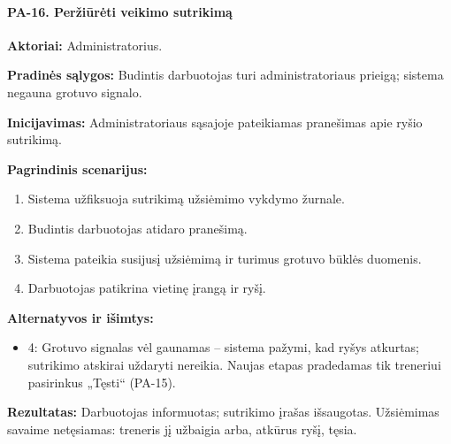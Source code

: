 \paragraph{PA-16. Peržiūrėti veikimo sutrikimą}\mbox{}\par
\textbf{Aktoriai:} Administratorius.\par
\textbf{Pradinės sąlygos:} Budintis darbuotojas turi administratoriaus prieigą; sistema negauna grotuvo signalo.\par
\textbf{Inicijavimas:} Administratoriaus sąsajoje pateikiamas pranešimas apie ryšio sutrikimą.\par
\textbf{Pagrindinis scenarijus:}
\begin{enumerate}
\item Sistema užfiksuoja sutrikimą užsiėmimo vykdymo žurnale.
\item Budintis darbuotojas atidaro pranešimą.
\item Sistema pateikia susijusį užsiėmimą ir turimus grotuvo būklės duomenis.
\item Darbuotojas patikrina vietinę įrangą ir ryšį.
\end{enumerate}
\textbf{Alternatyvos ir išimtys:}
\begin{itemize}
\item 4: Grotuvo signalas vėl gaunamas -- sistema pažymi, kad ryšys atkurtas; sutrikimo atskirai uždaryti nereikia. Naujas etapas pradedamas tik treneriui pasirinkus „Tęsti“ (PA-15).
\end{itemize}
\textbf{Rezultatas:} Darbuotojas informuotas; sutrikimo įrašas išsaugotas. Užsiėmimas savaime netęsiamas: treneris jį užbaigia arba, atkūrus ryšį, tęsia.\par
{}
